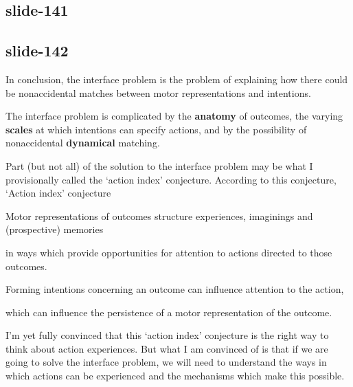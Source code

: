 \documentclass[12pt,\papersize]{extarticle}
\begin{document}
\subsection{slide-141}
 
\subsection{slide-142}
In conclusion,
the interface problem is the problem of explaining how there could be nonaccidental matches
between motor representations and intentions.
 
The interface problem is complicated by the \textbf{anatomy} of outcomes, the varying \textbf{scales}
at which intentions can specify actions, and by the possibility of nonaccidental \textbf{dynamical}
matching.
 
Part (but not all) of the solution to the interface problem may be what I provisionally called
the ‘action index’ conjecture.
According to this conjecture,
‘Action index’ conjecture

Motor representations of outcomes structure 
experiences, imaginings and (prospective) memories

in ways which provide opportunities for attention to actions directed to those outcomes.

Forming intentions concerning an outcome can influence attention to the action,

which can influence the persistence of a motor representation of the outcome.

 
I’m yet fully convinced that this ‘action index’ conjecture is the right way to think about
action experiences. But what I am convinced of is that if we are going to solve the interface
problem, we will need to understand the ways in which actions can be experienced and the mechanisms
which make this possible.
 






\end{document}
